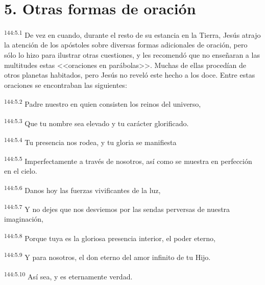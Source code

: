 \section*{5. Otras formas de oración}
\par 
\textsuperscript{144:5.1} De vez en cuando, durante el resto de su estancia en la Tierra, Jesús atrajo la atención de los apóstoles sobre diversas formas adicionales de oración, pero sólo lo hizo para ilustrar otras cuestiones, y les recomendó que no enseñaran a las multitudes estas <<oraciones en parábolas>>. Muchas de ellas procedían de otros planetas habitados, pero Jesús no reveló este hecho a los doce. Entre estas oraciones se encontraban las siguientes:
\begin{center}
\par 
\textsuperscript{144:5.2} Padre nuestro en quien consisten los reinos del universo,

\par 
\textsuperscript{144:5.3} Que tu nombre sea elevado y tu carácter glorificado.

\par 
\textsuperscript{144:5.4} Tu presencia nos rodea, y tu gloria se manifiesta

\par 
\textsuperscript{144:5.5} Imperfectamente a través de nosotros, así como se muestra en perfección en el cielo.

\par 
\textsuperscript{144:5.6} Danos hoy las fuerzas vivificantes de la luz,

\par 
\textsuperscript{144:5.7} Y no dejes que nos desviemos por las sendas perversas de nuestra imaginación,

\par 
\textsuperscript{144:5.8} Porque tuya es la gloriosa presencia interior, el poder eterno,

\par 
\textsuperscript{144:5.9} Y para nosotros, el don eterno del amor infinito de tu Hijo.

\par 
\textsuperscript{144:5.10} Así sea, y es eternamente verdad.
\end{center}

